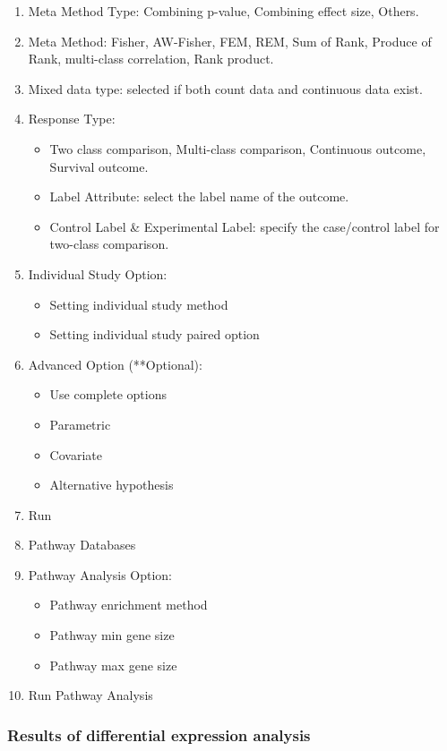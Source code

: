 \begin{enumerate}
  \item Meta Method Type: Combining p-value, Combining effect size, Others.
  \item Meta Method: Fisher, AW-Fisher, FEM, REM, Sum of Rank, Produce of Rank, multi-class correlation, Rank product. 
  \item Mixed data type: selected if both count data and continuous data exist.
  \item Response Type:
   \begin{itemize}
     \item Two class comparison, Multi-class comparison, Continuous outcome, Survival outcome.
     \item Label Attribute: select the label name of the outcome.
     \item Control Label \& Experimental Label: specify the case/control label for two-class comparison.
    \end{itemize}
   \item Individual Study Option:
     \begin{itemize}
     \item Setting individual study method
     \item Setting individual study paired option
    \end{itemize} 
   \item Advanced Option (**Optional):
     \begin{itemize}
      \item Use complete options
      \item Parametric
      \item Covariate
      \item Alternative hypothesis
    \end{itemize} 
    \item Run
    \item Pathway Databases
    \item Pathway Analysis Option:
         \begin{itemize}
      \item Pathway enrichment method
      \item Pathway min gene size
      \item Pathway max gene size
    \end{itemize} 
    \item Run Pathway Analysis
\end{enumerate}


\subsubsection{Results of differential expression analysis}

